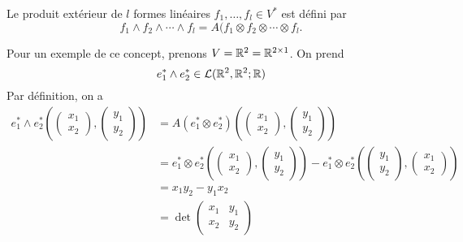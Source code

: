 \begin{definition}
  Le produit extérieur de $l$ formes linéaires $f_1, \dots, f_l \in V^*$ est défini par
  $$f_1 \wedge f_2 \wedge \cdots \wedge f_l = A(f_1\otimes f_2 \otimes \cdots \otimes f_l.$$
\end{definition}
Pour un exemple de ce concept, prenons $V = \mathbb{R}^2 =\mathbb{R}^{2\times 1}$. On prend
 $$e_1^* \wedge e_2^* \in \mathcal{L}(\mathbb{R}^2, \mathbb{R}^2; \mathbb{R})$$
 Par définition, on a
 \begin{align*}
   e_1^*\wedge e_2^* \left( \begin{pmatrix} x_1 \\ x_2\end{pmatrix}, \begin{pmatrix} y_1 \\ y_2\end{pmatrix} \right) &= A(e_1^* \otimes e_2^*)\left( \begin{pmatrix} x_1 \\ x_2\end{pmatrix}, \begin{pmatrix} y_1 \\ y_2\end{pmatrix} \right) \\
                                                                                                                      &= e_1^* \otimes e_2^* \left( \begin{pmatrix} x_1 \\ x_2\end{pmatrix}, \begin{pmatrix} y_1 \\ y_2\end{pmatrix} \right) - e_1^* \otimes e_2^* \left( \begin{pmatrix} y_1 \\ y_2\end{pmatrix}, \begin{pmatrix} x_1 \\ x_2\end{pmatrix} \right) \\
                                                                                                                      &= x_1y_2 - y_1x_2 \\
                                                                                                                      &= \det \begin{pmatrix} x_1 & y_1 \\ x_2 & y_2 \end{pmatrix}
 \end{align*}



